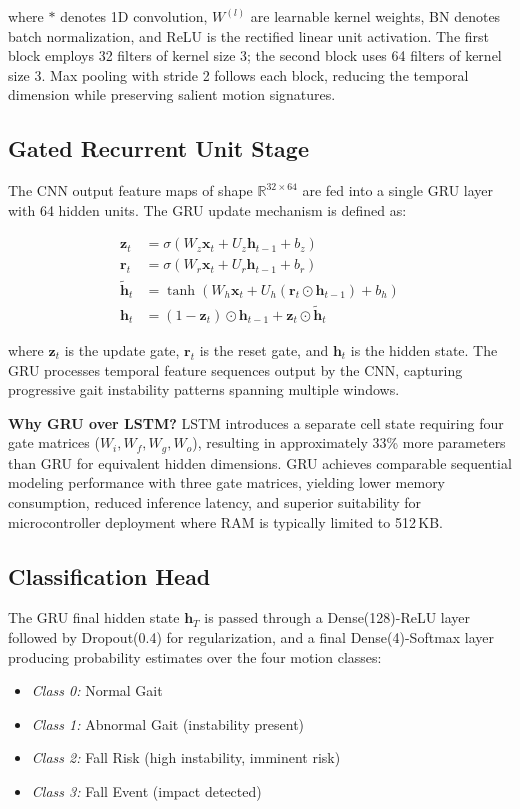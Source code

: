 \documentclass[conference]{IEEEtran}
\begin{document}
where $*$ denotes 1D convolution, $W^{(l)}$ are learnable kernel weights, BN denotes batch normalization, and ReLU is the rectified linear unit activation. The first block employs 32 filters of kernel size 3; the second block uses 64 filters of kernel size 3. Max pooling with stride 2 follows each block, reducing the temporal dimension while preserving salient motion signatures.

\subsection{Gated Recurrent Unit Stage}

The CNN output feature maps of shape $\mathbb{R}^{32 \times 64}$ are fed into a single GRU layer with 64 hidden units. The GRU update mechanism is defined as:

\begin{align}
\mathbf{z}_t &= \sigma(W_z \mathbf{x}_t + U_z \mathbf{h}_{t-1} + b_z) \\
\mathbf{r}_t &= \sigma(W_r \mathbf{x}_t + U_r \mathbf{h}_{t-1} + b_r) \\
\tilde{\mathbf{h}}_t &= \tanh(W_h \mathbf{x}_t + U_h(\mathbf{r}_t \odot \mathbf{h}_{t-1}) + b_h) \\
\mathbf{h}_t &= (1 - \mathbf{z}_t) \odot \mathbf{h}_{t-1} + \mathbf{z}_t \odot \tilde{\mathbf{h}}_t
\end{align}

where $\mathbf{z}_t$ is the update gate, $\mathbf{r}_t$ is the reset gate, and $\mathbf{h}_t$ is the hidden state. The GRU processes temporal feature sequences output by the CNN, capturing progressive gait instability patterns spanning multiple windows.

\textbf{Why GRU over LSTM?} LSTM introduces a separate cell state requiring four gate matrices ($W_i, W_f, W_g, W_o$), resulting in approximately 33\% more parameters than GRU for equivalent hidden dimensions. GRU achieves comparable sequential modeling performance with three gate matrices, yielding lower memory consumption, reduced inference latency, and superior suitability for microcontroller deployment where RAM is typically limited to 512\,KB.

\subsection{Classification Head}

The GRU final hidden state $\mathbf{h}_T$ is passed through a Dense(128)-ReLU layer followed by Dropout(0.4) for regularization, and a final Dense(4)-Softmax layer producing probability estimates over the four motion classes:
\begin{itemize}
  \item \textit{Class 0:} Normal Gait
  \item \textit{Class 1:} Abnormal Gait (instability present)
  \item \textit{Class 2:} Fall Risk (high instability, imminent risk)
  \item \textit{Class 3:} Fall Event (impact detected)
\end{itemize}
\end{document}
